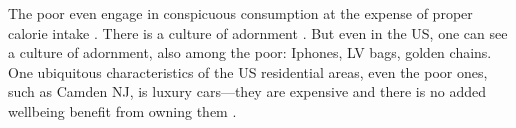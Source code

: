 \documentclass[10pt, letterpaper]{article}
\begin{document}
\begin{spacing}{1.8}
{The poor even engage in conspicuous consumption at the expense of proper calorie intake \citep{bellet18}. There is a culture of adornment \citep{cordwell2011fabrics,mascia1992tattoo}. But even in the US, one can see a culture of adornment, also among the poor: Iphones, LV bags, golden chains. %
 One ubiquitous characteristics of the US residential areas, even the poor ones,
 such as Camden NJ, is luxury cars---they are expensive and there is no added    
 wellbeing benefit from owning them \citep{aok_ls_car15}.
}


\end{spacing}
\end{document}
